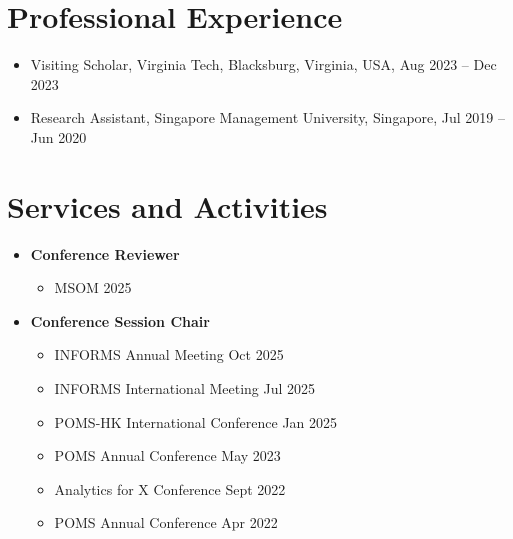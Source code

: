 \documentclass[12pt, a4paper]{article}
\begin{document}
{\begin{itemize}
\end{itemize}




\section*{Professional Experience}

\begin{itemize}[leftmargin=30pt]
    \item Visiting Scholar, Virginia Tech, Blacksburg, Virginia, USA, Aug 2023 -- Dec 2023	
    \item Research Assistant, Singapore Management University, Singapore, Jul 2019 -- Jun 2020
\end{itemize}




\section*{Services and Activities}

\begin{itemize}

	\item[] \textbf{Conference Reviewer}
	\begin{itemize}
		\item MSOM 2025
	\end{itemize}

	\item[] \textbf{Conference Session Chair}
	\begin{itemize}
		\item INFORMS Annual Meeting \hfill Oct 2025
		\item INFORMS International Meeting \hfill Jul 2025
		\item POMS-HK International Conference \hfill Jan 2025
		\item POMS Annual Conference \hfill May 2023
		\item Analytics for X Conference \hfill Sept 2022
		\item POMS Annual Conference \hfill Apr 2022
	\end{itemize}


\end{itemize}}
\end{document}
